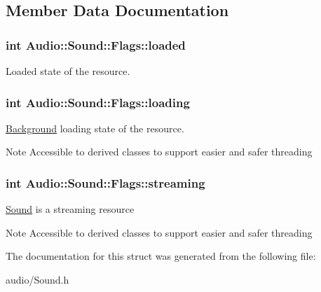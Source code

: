 \subsection{Member Data Documentation}
\subsubsection[{\texorpdfstring{loaded}{loaded}}]{\setlength{\rightskip}{0pt plus 5cm}int Audio\+::\+Sound\+::\+Flags\+::loaded}\hypertarget{structAudio_1_1Sound_1_1Flags_a983c6af241ce852ef7dc7aa28d007e86}{}\label{structAudio_1_1Sound_1_1Flags_a983c6af241ce852ef7dc7aa28d007e86}
Loaded state of the resource. 
\subsubsection[{\texorpdfstring{loading}{loading}}]{\setlength{\rightskip}{0pt plus 5cm}int Audio\+::\+Sound\+::\+Flags\+::loading}\hypertarget{structAudio_1_1Sound_1_1Flags_aee2379eb089d1b1b0a5a59dc654d282e}{}\label{structAudio_1_1Sound_1_1Flags_aee2379eb089d1b1b0a5a59dc654d282e}
\hyperlink{classBackground}{Background} loading state of the resource. \begin{DoxyNote}{Note}
Accessible to derived classes to support easier and safer threading 
\end{DoxyNote}
\subsubsection[{\texorpdfstring{streaming}{streaming}}]{\setlength{\rightskip}{0pt plus 5cm}int Audio\+::\+Sound\+::\+Flags\+::streaming}\hypertarget{structAudio_1_1Sound_1_1Flags_a21c89ac7107c98af17861a5fde0ad7f4}{}\label{structAudio_1_1Sound_1_1Flags_a21c89ac7107c98af17861a5fde0ad7f4}
\hyperlink{classAudio_1_1Sound}{Sound} is a streaming resource \begin{DoxyNote}{Note}
Accessible to derived classes to support easier and safer threading 
\end{DoxyNote}


The documentation for this struct was generated from the following file\+:\begin{DoxyCompactItemize}
\item 
audio/Sound.\+h\end{DoxyCompactItemize}
